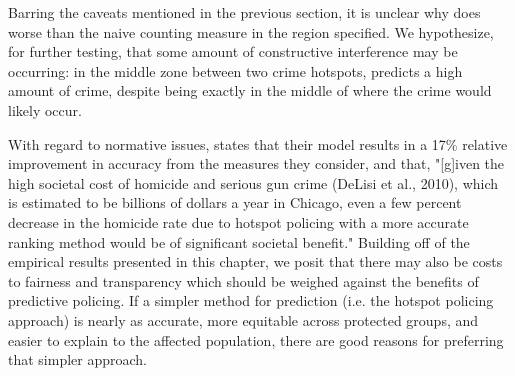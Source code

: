 Barring the caveats mentioned in the previous section, it is unclear why \pp does worse than the naive counting measure in the region specified. We hypothesize, for further testing, that some amount of constructive interference may be occurring: in the middle zone between two crime hotspots, \pp predicts a high amount of crime, despite being exactly in the middle of where the crime would likely occur.

With regard to normative issues, \citet{mohler_marked_2014} states that their model results in a 17\% relative improvement in accuracy from the measures they consider, and that, "[g]iven the high societal cost of homicide and serious gun crime (DeLisi et al., 2010), which is estimated to be billions of dollars a year in Chicago, even a few percent decrease in the homicide rate due to hotspot policing with a more accurate ranking method would be of significant societal benefit." Building off of the empirical results presented in this chapter, we posit that there may also be costs to fairness and transparency which should be weighed against the benefits of predictive policing. If a simpler method for prediction (i.e. the hotspot policing approach) is nearly as accurate, more equitable across protected groups, and easier to explain to the affected population, there are good reasons for preferring that simpler approach.
